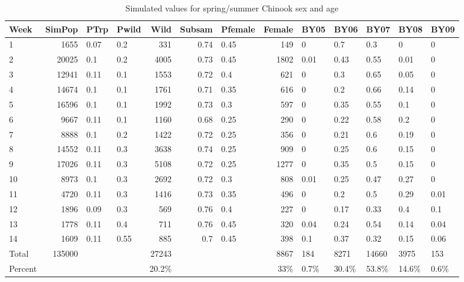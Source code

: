 \documentclass[12pt]{article}
\begin{document}
\begin{table} [h]
\caption{Simulated values for spring/summer Chinook sex and age}
\label{table:CHsimSA} 
\centering
\begin{tabular}{ | l | r | l | l | r | r | l | r | l | l | l | l | l | }
\hline
Week&SimPop&PTrp&Pwild&Wild&Subsam&Pfemale&Female&BY05&BY06&BY07&BY08&BY09 \\ \hline
1&1655&0.07&0.2&331&0.74&0.45&149&0&0.7&0.3&0&0 \\ \hline
2&20025&0.1&0.2&4005&0.73&0.45&1802&0.01&0.43&0.55&0.01&0 \\ \hline
3&12941&0.11&0.1&1553&0.72&0.4&621&0&0.3&0.65&0.05&0 \\ \hline
4&14674&0.1&0.1&1761&0.71&0.35&616&0&0.2&0.66&0.14&0 \\ \hline
5&16596&0.1&0.1&1992&0.73&0.3&597&0&0.35&0.55&0.1&0 \\ \hline
6&9667&0.11&0.1&1160&0.68&0.25&290&0&0.22&0.58&0.2&0 \\ \hline
7&8888&0.1&0.2&1422&0.72&0.25&356&0&0.21&0.6&0.19&0 \\ \hline
8&14552&0.11&0.3&3638&0.74&0.25&909&0&0.25&0.6&0.15&0 \\ \hline
9&17026&0.11&0.3&5108&0.72&0.25&1277&0&0.35&0.5&0.15&0 \\ \hline
10&8973&0.1&0.3&2692&0.72&0.3&808&0.01&0.25&0.47&0.27&0 \\ \hline
11&4720&0.11&0.3&1416&0.73&0.35&496&0&0.2&0.5&0.29&0.01 \\ \hline
12&1896&0.09&0.3&569&0.76&0.4&227&0&0.17&0.33&0.4&0.1 \\ \hline
13&1778&0.11&0.4&711&0.76&0.45&320&0.04&0.24&0.54&0.14&0.04 \\ \hline
14&1609&0.11&0.55&885&0.7&0.45&398&0.1&0.37&0.32&0.15&0.06 \\ \hline
Total&135000&&&27243&&&8867&184&8271&14660&3975&153 \\ \hline
Percent&&&&20.2\%&&&33\%&0.7\%&30.4\%&53.8\%&14.6\%&0.6\% \\ \hline
\end{tabular}
\end{table}
\end{document}
